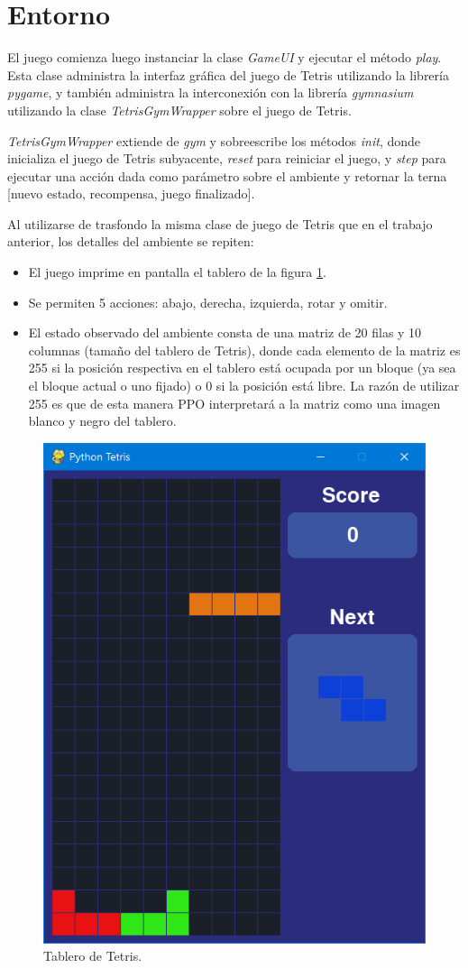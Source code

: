 \section{Entorno}
\label{sec:entorno}

El juego comienza luego instanciar la clase \textit{GameUI} y ejecutar el método \textit{play}. Esta clase administra la interfaz gráfica del juego de Tetris utilizando la librería \textit{pygame}, y también administra la interconexión con la librería \textit{gymnasium} utilizando la clase \textit{TetrisGymWrapper} sobre el juego de Tetris. 

\textit{TetrisGymWrapper} extiende de \textit{gym} y sobreescribe los métodos \textit{init}, donde inicializa el juego de Tetris subyacente, \textit{reset} para reiniciar el juego, y \textit{step} para ejecutar una acción dada como parámetro sobre el ambiente y retornar la terna [nuevo estado, recompensa, juego finalizado].

Al utilizarse de trasfondo la misma clase de juego de Tetris que en el trabajo anterior, los detalles del ambiente se repiten: 
\begin{itemize}
    \item El juego imprime en pantalla el tablero de la figura \ref{fig:board}. 
    \item Se permiten 5 acciones: abajo, derecha, izquierda, rotar y omitir.
    \item El estado observado del ambiente consta de una matriz de 20 filas y 10 columnas (tamaño del tablero de Tetris), donde cada elemento de la matriz es 255 si la posición respectiva en el tablero está ocupada por un bloque (ya sea el bloque actual o uno fijado) o 0 si la posición está libre. La razón de utilizar 255 es que de esta manera PPO interpretará a la matriz como una imagen blanco y negro del tablero.
\end{itemize}

\begin{figure}[htbp]
	\centering
	\includegraphics[width=.5\textwidth]{./Figures/tetris.png}
	\caption{Tablero de Tetris.}
	\label{fig:board}
\end{figure}

